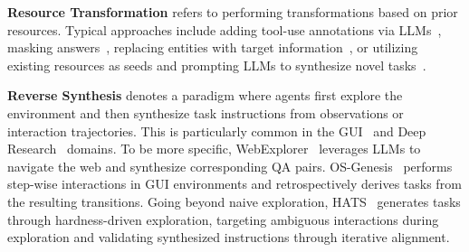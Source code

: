 \documentclass{llmxive}
\begin{document}
\textbf{Resource Transformation} refers to performing transformations based on prior resources. Typical approaches include adding tool-use annotations via LLMs~\cite{Toolformer, ToolCoder, ToolBench}, masking answers~\cite{MaskSearch}, replacing entities with target information~\cite{VSearcher, WebWatcher}, or utilizing existing resources as seeds and prompting LLMs to synthesize novel tasks~\cite{Self-Improvement, Lingma_SWE-GPT}.


\textbf{Reverse Synthesis} denotes a paradigm where agents first explore the environment and then synthesize task instructions from observations or interaction trajectories. This is particularly common in the GUI~\cite{OS-Genesis, AutoPlay, HATS} and Deep Research~\cite{BAGEL, Explorer, Insta, Cognitive_Kernel_Pro, WebExplorer, WebAggregator, SynthAgent, AgentEvolver} domains. To be more specific, WebExplorer~\cite{WebExplorer} leverages LLMs to navigate the web and synthesize corresponding QA pairs. OS-Genesis~\cite{OS-Genesis} performs step-wise interactions in GUI environments and retrospectively derives tasks from the resulting transitions. Going beyond naive exploration, HATS~\cite{HATS} generates tasks through hardness-driven exploration, targeting ambiguous interactions during exploration and validating synthesized instructions through iterative alignment.
\end{document}
